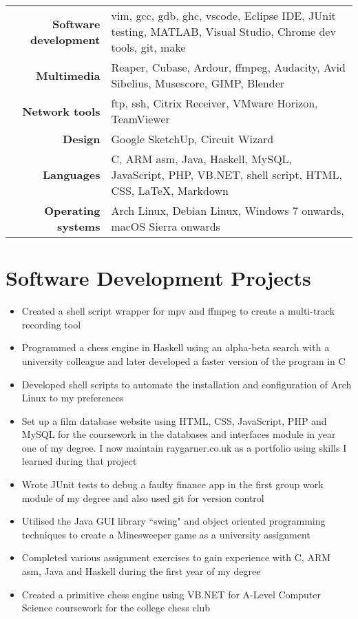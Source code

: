 \documentclass{article}
\begin{document}
\begin{tabular}{ r | p{12cm} }

{\large\bfseries Software development} & {vim, gcc, gdb, ghc, vscode, Eclipse IDE, JUnit testing, MATLAB, Visual Studio, Chrome dev tools, git, make}\\
{\large\bfseries Multimedia} & {Reaper, Cubase, Ardour, ffmpeg, Audacity, Avid Sibelius, Musescore, GIMP, Blender} \\
{\large\bfseries Network tools} & {ftp, ssh, Citrix Receiver, VMware Horizon, TeamViewer} \\
{\large\bfseries Design} & {Google SketchUp, Circuit Wizard} \\
{\large\bfseries Languages} & {C, ARM asm, Java, Haskell, MySQL, JavaScript, PHP, VB.NET, shell script, HTML, CSS, \LaTeX, Markdown}\\
{\large\bfseries Operating systems} & {Arch Linux, Debian Linux, Windows 7 onwards, macOS Sierra onwards}\\
\end{tabular}

\section{Software Development Projects}

\begin{itemize}[noitemsep]

\renewcommand{\labelitemi}{$\square$}

\item Created a shell script wrapper for mpv and ffmpeg to create a multi-track recording tool
\item Programmed a chess engine in Haskell using an alpha-beta search with a university colleague and later developed a faster version of the program in C
\item Developed shell scripts to automate the installation and configuration of Arch Linux to my preferences 
\item Set up a film database website using HTML, CSS, JavaScript, PHP and MySQL for the coursework in the databases and interfaces module in year one of my degree. I now maintain raygarner.co.uk as a portfolio using skills I learned during that project
\item Wrote JUnit tests to debug a faulty finance app in the first group work module of my degree and also used git for version control
\item Utilised the Java GUI library ``swing" and object oriented programming techniques to create a Minesweeper game as a university assignment
\item Completed various assignment exercises to gain experience with C, ARM asm, Java and Haskell during the first year of my degree
\item Created a primitive chess engine using VB.NET for A-Level Computer Science coursework for the college chess club

\end{itemize}
\end{document}
